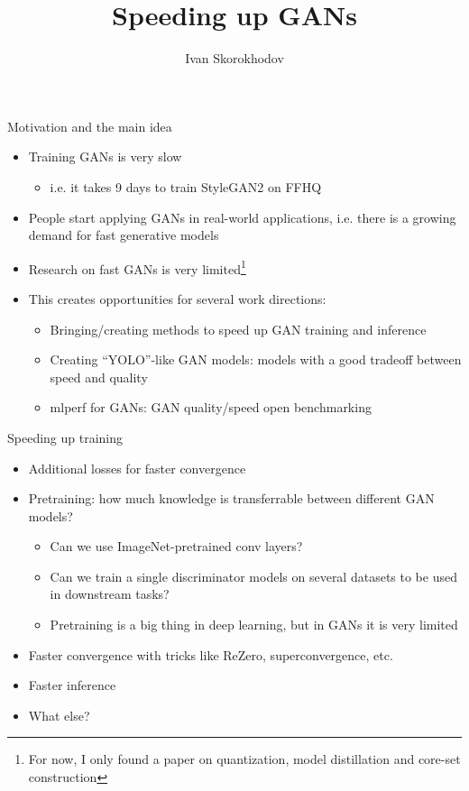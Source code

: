 \documentclass[10pt, handout]{beamer}
\title{Speeding up GANs}
\author{Ivan Skorokhodov}
\begin{document}
\begin{frame}
    \titlepage
\end{frame}


\begin{frame}{Motivation and the main idea}
    \begin{itemize}
        \item\pause Training GANs is very slow
        \begin{itemize}
            \item\pause i.e. it takes 9 days to train StyleGAN2 on FFHQ
        \end{itemize}
        \item\pause People start applying GANs in real-world applications, i.e. there is a growing demand for fast generative models
        \item\pause Research on fast GANs is very limited\footnote{For now, I only found a paper on quantization, model distillation and core-set construction}
        \item\pause This creates opportunities for several work directions:
        \begin{itemize}
            \item Bringing/creating methods to speed up GAN training and inference
            \item Creating ``YOLO''-like GAN models: models with a good tradeoff between speed and quality
            \item mlperf for GANs: GAN quality/speed open benchmarking
        \end{itemize}
    \end{itemize}
\end{frame}


\begin{frame}{Speeding up training}
    \begin{itemize}
        \item\pause Additional losses for faster convergence
        \item\pause Pretraining: how much knowledge is transferrable between different GAN models?
        \begin{itemize}
            \item\pause Can we use ImageNet-pretrained conv layers?
            \item\pause Can we train a single discriminator models on several datasets to be used in downstream tasks?
            \item\pause Pretraining is a big thing in deep learning, but in GANs it is very limited
        \end{itemize}
        \item\pause Faster convergence with tricks like ReZero, superconvergence, etc.
        \item\pause Faster inference
        \item\pause What else?
    \end{itemize}
\end{frame}
\end{document}
